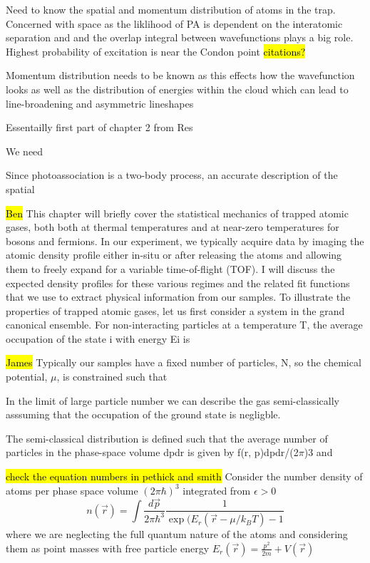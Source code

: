 Need to know the spatial and momentum distribution of atoms in the trap. Concerned with space as the liklihood of PA is dependent on the interatomic separation and and the overlap integral between wavefunctions plays a big role. Highest probability of excitation is near the Condon point \hl{citations?}

Momentum distribution needs to be known as this effects how the wavefunction looks as well as the distribution of energies within the cloud which can lead to line-broadening and asymmetric lineshapes

Essentailly first part of chapter 2 from Res

We need 

Since photoassociation is a two-body process, an accurate description of the spatial

\hl{Ben}
This chapter will briefly cover the statistical mechanics of trapped atomic gases,
both both at thermal temperatures and at near-zero temperatures for bosons and fermions. In our experiment, we typically acquire data by imaging the atomic density profile either in-situ or after releasing the atoms and allowing them to freely expand for a variable time-of-flight (TOF). I will discuss the expected density profiles for these various regimes and the related fit functions that we use to extract physical information from our samples. To illustrate the properties of trapped atomic gases, let us first consider a system
in the grand canonical ensemble. For non-interacting particles at a temperature T, the average occupation of the state i with energy Ei is

\hl{James}
Typically our samples have a fixed number of particles, N, so the chemical potential, $\mu$, is constrained such that

In the limit of large particle number we can describe the gas semi-classically asssuming that the occupation of the ground state is negligble.

The semi-classical distribution is defined such that the average number of particles in the phase-space volume dpdr is given by f(r, p)dpdr/(2$\pi$)3 and

\hl{check the equation numbers in pethick and smith}
Consider the number density of atoms per phase space volume $(2 \pi \hbar)^3$ integrated from $\epsilon > 0$
\begin{equation}
	n(\vec{r}) = \int \frac{d\vec{p}}{2\pi\hbar^3}\frac{1}{\exp(E_r(\vec{r} - \mu/k_BT) - 1}
\end{equation}
where we are neglecting the full quantum nature of the atoms and considering them as point masses with free particle energy $E_r(\vec{r}) = \frac{p^2}{2m} + V(\vec{r})$

